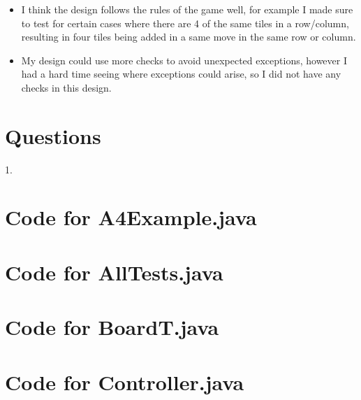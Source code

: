 \documentclass[12pt]{article}
\begin{document}
\begin{itemize}
    \item I think the design follows the rules of the game well, for example I made sure to test for certain cases where there are 4 of the same tiles in a row/column, resulting in four tiles being added in a same move in the same row or column.
    \item My design could use more checks to avoid unexpected exceptions, however I had a hard time seeing where exceptions could arise, so I did not have any checks in this design.
    
\end{itemize}

\newpage
\section* {Questions}
1.
\newpage

\lstset{language=Java, basicstyle=\tiny, breaklines=true, showspaces=false,
  showstringspaces=false, breakatwhitespace=true}

\def\thesection{\Alph{section}}

\section{Code for A4Example.java}

\noindent 

\newpage

\section{Code for AllTests.java}

\noindent 

\newpage

\section{Code for BoardT.java}

\noindent 

\newpage

\section{Code for Controller.java}

\noindent 
\end{document}
